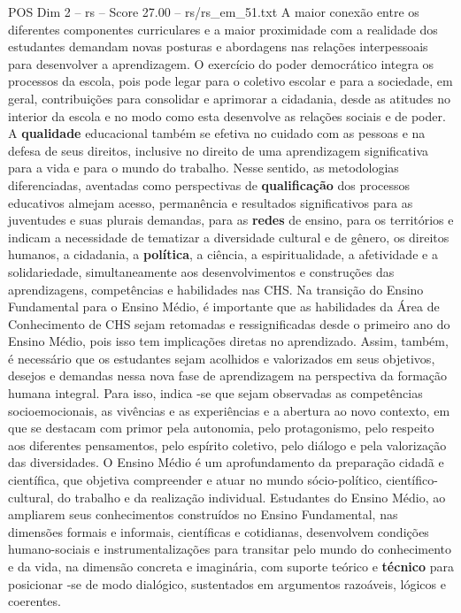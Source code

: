 \begin{textsample}{POS Dim 2 – rs – Score 27.00 – rs/rs\_em\_51.txt}
A maior conexão entre os diferentes componentes curriculares e a maior proximidade com a realidade dos estudantes demandam novas posturas e abordagens nas relações interpessoais para desenvolver a aprendizagem.
O exercício do poder democrático integra os processos da escola, pois pode legar para o coletivo escolar e para a sociedade, em geral, contribuições para consolidar e aprimorar a cidadania, desde as atitudes no interior da escola e no modo como esta desenvolve as relações sociais e de poder.
A \textbf{qualidade} educacional também se efetiva no cuidado com as pessoas e na defesa de seus direitos, inclusive no direito de uma aprendizagem significativa para a vida e para o mundo do trabalho.
Nesse sentido, as metodologias diferenciadas, aventadas como perspectivas de \textbf{qualificação} dos processos educativos almejam acesso, permanência e resultados significativos para as juventudes e suas plurais demandas, para as \textbf{redes} de ensino, para os territórios e indicam a necessidade de tematizar a diversidade cultural e de gênero, os direitos humanos, a cidadania, a \textbf{política}, a ciência, a espiritualidade, a afetividade e a solidariedade, simultaneamente aos desenvolvimentos e construções das aprendizagens, competências e habilidades nas CHS.
Na transição do Ensino Fundamental para o Ensino Médio, é importante que as habilidades da Área de Conhecimento de CHS sejam retomadas e ressignificadas desde o primeiro ano do Ensino Médio, pois isso tem implicações diretas no aprendizado.
Assim, também, é necessário que os estudantes sejam acolhidos e valorizados em seus objetivos, desejos e demandas nessa nova fase de aprendizagem na perspectiva da formação humana integral.
Para isso, indica -se que sejam observadas as competências socioemocionais, as vivências e as experiências e a abertura ao novo contexto, em que se destacam com primor pela autonomia, pelo protagonismo, pelo respeito aos diferentes pensamentos, pelo espírito coletivo, pelo diálogo e pela valorização das diversidades.
O Ensino Médio é um aprofundamento da preparação cidadã e científica, que objetiva compreender e atuar no mundo sócio-político, científico-cultural, do trabalho e da realização individual.
Estudantes do Ensino Médio, ao ampliarem seus conhecimentos construídos no Ensino Fundamental, nas dimensões formais e informais, científicas e cotidianas, desenvolvem condições humano-sociais e instrumentalizações para transitar pelo mundo do conhecimento e da vida, na dimensão concreta e imaginária, com suporte teórico e \textbf{técnico} para posicionar -se de modo dialógico, sustentados em argumentos razoáveis, lógicos e coerentes.

\end{textsample}
